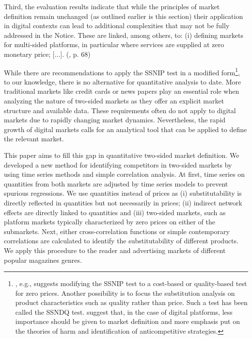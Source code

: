 \documentclass[12pt,a4paper,notitlepage]{article}
\begin{document}
\begin{displayquote}
Third, the evaluation results indicate that while the principles of market definition remain unchanged (as outlined earlier is this section) their application in digital contexts can lead to additional complexities that may not be fully addressed in the Notice. These are linked, among others, to: (i) defining markets for multi-sided platforms, in particular where services are supplied at zero monetary price; [...]. (\citet{europeancommission_evaluation_2021}, p. 68)
\end{displayquote}

While there are recommendations to apply the SSNIP test in a modified form\footnote{\citet{newman_antitrust_2015}, e.g., suggests modifying the SSNIP test to a cost-based or quality-based test for zero prices. Another possibility is to focus the substitution analysis on product characteristics such as quality rather than price. Such a test has been called the SSNDQ test. \citet{cremer_competition_2019} suggest that, in the case of digital platforms, less importance should be given to market definition and more emphasis put on the theories of harm and identification of anticompetitive strategies.}, to our knowledge, there is no alternative for quantitative analysis to date. More traditional markets like credit cards or news papers play an essential role when analyzing the nature of two-sided markets as they offer an explicit market structure and available data. These requirements often do not apply to digital markets due to rapidly changing market dynamics. Nevertheless, the rapid growth of digital markets calls for an analytical tool that can be applied to define the relevant market.

This paper aims to fill this gap in quantitative two-sided market definition. We developed a new method for identifying competitors in two-sided markets by using time series methods and simple correlation analysis. At first, time series on quantities from both markets are adjusted by time series models to prevent spurious regressions. We use quantities instead of prices as (i) substitutability is directly reflected in quantities but not necessarily in prices; (ii) indirect network effects are directly linked to quantities and (iii) two-sided markets, such as platform markets typically characterized by zero prices on either of the submarkets. Next, either cross-correlation functions or simple contemporary correlations are calculated to identify the substitutability of different products. We apply this procedure to the reader and advertising markets of different popular magazines genres. 
\end{document}
